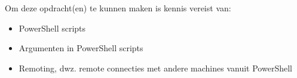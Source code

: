 Om deze opdracht(en) te kunnen maken is kennis vereist van:
\begin{itemize}
\item PowerShell scripts
\item Argumenten in PowerShell scripts
\item Remoting, dwz. remote connecties met andere machines vanuit PowerShell
\end{itemize}

